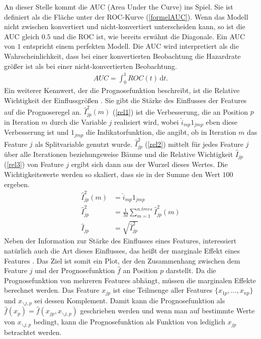 An dieser Stelle kommt die AUC (Area Under the Curve) ins Spiel. Sie ist definiert als die Fläche unter der ROC-Kurve (\ref{formelAUC}). Wenn das Modell nicht zwischen konvertiert und nicht-konvertiert unterscheiden kann, so ist die AUC gleich $0.5$ und die ROC ist, wie bereits erwähnt die Diagonale. Ein AUC von $1$ entspricht einem perfekten Modell. Die AUC wird interpretiert als die Wahrscheinlichkeit, dass bei einer konvertierten Beobachtung die Hazardrate größer ist als bei einer nicht-konvertierten Beobachtung.
\begin{align}
	AUC = \int_0^1 \! ROC(t) \, \mathrm{d}t. \label{formelAUC}
\end{align}
Ein weiterer Kennwert, der die Prognosefunktion beschreibt, ist die Relative Wichtigkeit der Einflussgrößen \cite{fried_greedy}. Sie gibt die Stärke des Einflusses der Features auf die Prognoseregel an. $\hat{I}_{jp}^2(m)$ (\ref{rel1}) ist die Verbesserung, die an Position $p$ in Iteration $m$ durch die Variable $j$ realisiert wird, wobei $\hat{i}_{mp} 1_{jmp}$ eben diese Verbesserung ist und $1_{jmp}$ die Indikatorfunktion, die angibt, ob in Iteration $m$ das Feature $j$ als Splitvariable genutzt wurde. $\hat{I}_{jp}^2$ (\ref{rel2}) mittelt für jedes Feature $j$ über alle Iterationen beziehungsweise Bäume und die Relative Wichtigkeit $\hat{I}_{jp}$ (\ref{rel3}) von Feature $j$ ergibt sich dann aus der Wurzel dieses Wertes. Die Wichtigkeitswerte werden so skaliert, dass sie in der Summe den Wert $100$ ergeben.
\begin{align}
	\hat{I}_{jp}^2(m) &= \hat{i}_{mp} 1_{jmp} \label{rel1} \\
	\hat{I}_{jp}^2 &= \frac{1}{M} \sum_{m=1}^{n.trees} \hat{I}_{jp}^2(m) \label{rel2} \\
	\hat{I}_{jp} &= \sqrt{\hat{I}_{jp}^2} \label{rel3}
\end{align}
Neben der Information zur Stärke des Einflusses eines Features, interessiert natürlich auch die Art dieses Einflusses, das heißt der marginale Effekt eines Features \cite{fried_greedy}. Das Ziel ist somit ein Plot, der den Zusammenhang zwischen dem Feature $j$ und der Prognosefunktion $\hat{f}$ an Position $p$ darstellt. Da die Prognosefunktion von mehreren Features abhängt, müssen die marginalen Effekte berechnet werden. Das Feature $x_{jp}$ ist eine Teilmenge aller Features $\{x_{1p},...,x_{np}\}$ und $x_{\backslash j,p}$ sei dessen Komplement. Damit kann die Prognosefunktion als $\hat{f}(x_p)=\hat{f}(x_{jp},x_{\backslash j,p})$ geschrieben werden und wenn man auf bestimmte Werte von $x_{\backslash j,p}$ bedingt, kann die Prognosefunktion als Funktion von lediglich $x_{jp}$ betrachtet werden.
